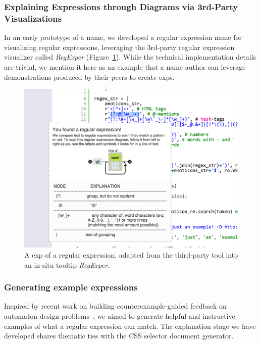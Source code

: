 \subsubsection{Explaining Expressions through Diagrams via 3rd-Party Visualizations}

In an early prototype of a \gls{name}, we developed a regular expression \gls{name} for visualizing regular expressions, leveraging the 3rd-party regular expression visualizer called \emph{RegExper} (Figure~\ref{fig:regex_visualization}).
While the technical implementation details are trivial, we mention it here as an example that a \gls{name} author can leverage demonstrations produced by their peers to create \glspl{exp}.

\begin{figure}
\centering
\includegraphics[width=\columnwidth]{figures/explain_on_select}
\caption{A \gls{exp} of a regular expression, adapted from the third-party tool into an in-situ tooltip \emph{RegExper}.}
\label{fig:regex_visualization}
\end{figure}

\subsubsection{Generating example expressions}

Inspired by recent work on building counterexample-guided feedback on automaton design problems~\cite{dantoni_how_2015}, we aimed to generate helpful and instructive examples of what a regular expression can match.
The explanation stage we have developed shares thematic ties with the CSS selector document generator. 
\fi

